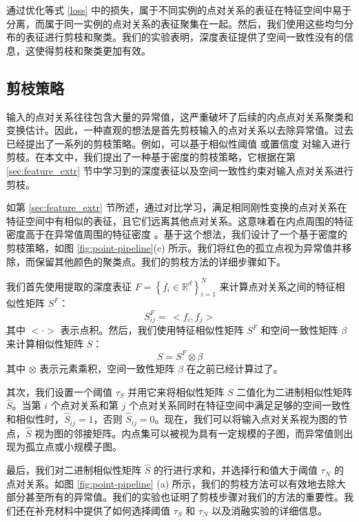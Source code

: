 通过优化等式 \ref{loss} 中的损失，属于不同实例的点对关系的表征在特征空间中易于分离，而属于同一实例的点对关系的表征聚集在一起。然后，我们使用这些均匀分布的表征进行剪枝和聚类。我们的实验表明，深度表征提供了空间一致性没有的信息，这使得剪枝和聚类更加有效。

\subsection{剪枝策略}\label{sec:pruning}
输入的点对关系往往包含大量的异常值，这严重破坏了后续的内点点对关系聚类和变换估计。因此，一种直观的想法是首先剪枝输入的点对关系以去除异常值。过去已经提出了一系列的剪枝策略。例如，可以基于相似性阈值 \cite{heckel2013subspace} 或置信度 \cite{zhao2021progressive} 对输入进行剪枝。在本文中，我们提出了一种基于密度的剪枝策略，它根据在第 \ref{sec:feature_extr} 节中学习到的深度表征以及空间一致性约束对输入点对关系进行剪枝。

如第 \ref{sec:feature_extr} 节所述，通过对比学习，满足相同刚性变换的点对关系在特征空间中有相似的表征，且它们远离其他点对关系。这意味着在内点周围的特征密度高于在异常值周围的特征密度 \cite{torr2002napsac} 。基于这个想法，我们设计了一个基于密度的剪枝策略，如图 \ref{fig:point-pipeline}(c) 所示。我们将红色的孤立点视为异常值并移除，而保留其他颜色的聚类点。我们的剪枝方法的详细步骤如下。

我们首先使用提取的深度表征 $F=\left\{f_{i} \in \mathbb{R}^{d}\right\}_{i=1}^{N}$ 来计算点对关系之间的特征相似性矩阵 $S^F$：
\begin{equation}
  S_{i j}^{F}= \, <f_{i}, f_{j}>
\end{equation}
其中 $<\cdot>$ 表示点积。然后，我们使用特征相似性矩阵 $S^F$ 和空间一致性矩阵 $\beta$ 来计算相似性矩阵 $S$：
\begin{equation}
  S=S^{F} \otimes \beta
\end{equation}
其中 $\otimes$ 表示元素乘积，空间一致性矩阵 $\beta$ 在之前已经计算过了。

其次，我们设置一个阈值 $\tau_{S}$ 并用它来将相似性矩阵 $S$ 二值化为二进制相似性矩阵 $\hat{S}$。当第 $i$ 个点对关系和第 $j$ 个点对关系同时在特征空间中满足足够的空间一致性和相似性时，$\hat{S}_{ij}=1$，否则 $\hat{S}_{i j}=0$。现在，我们可以将输入点对关系视为图的节点，$\hat{S}$ 视为图的邻接矩阵。内点集可以被视为具有一定规模的子图，而异常值则出现为孤立点或小规模子图。

最后，我们对二进制相似性矩阵 $\hat{S}$ 的行进行求和，并选择行和值大于阈值 $\tau_N$ 的点对关系。如图 \ref{fig:point-pipeline} (a) 所示，我们的剪枝方法可以有效地去除大部分甚至所有的异常值。我们的实验也证明了剪枝步骤对我们的方法的重要性。我们还在补充材料中提供了如何选择阈值 $\tau_S$ 和 $\tau_N$ 以及消融实验的详细信息。

